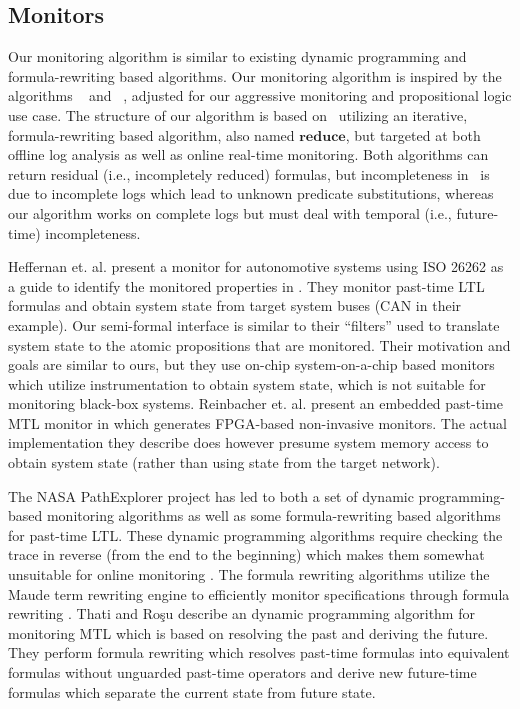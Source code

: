 
\subsection{Monitors}
Our monitoring algorithm is similar to existing dynamic programming and formula-rewriting based algorithms. 
Our monitoring algorithm is inspired by the algorithms \greduce\ \cite{Garg2011} and \precis\ \cite{Chowdhury2014}, adjusted for our aggressive monitoring and propositional logic use case. The structure of our algorithm is based on \greduce\, utilizing an iterative, formula-rewriting based algorithm, also named $\mathbf{reduce}$, but targeted at both offline log analysis as well as online real-time monitoring. Both algorithms can return residual (i.e., incompletely reduced) formulas, but incompleteness in \greduce\ is due to incomplete logs which lead to unknown predicate substitutions, whereas our algorithm works on complete logs but must deal with temporal (i.e., future-time) incompleteness. 

Heffernan et. al. present a monitor for autonomotive systems using ISO 26262 as a guide to identify the monitored properties in \cite{Heffernan2014}. They monitor past-time LTL formulas and obtain system state from target system buses (CAN in their example). Our semi-formal interface is similar to their ``filters'' used to translate system state to the atomic propositions that are monitored. Their motivation and goals are similar to ours, but they use on-chip system-on-a-chip based monitors which utilize instrumentation to obtain system state, which is not suitable for monitoring black-box systems.
Reinbacher et. al. present an embedded past-time MTL monitor in \cite{Reinbacher2013} which generates FPGA-based non-invasive monitors. 
The actual implementation they describe does however presume system memory access to obtain system state (rather than using state from the target network).

The NASA PathExplorer project has led to both a set of dynamic programming-based monitoring algorithms as well as some formula-rewriting based algorithms \cite{Havelund2004} for past-time LTL. These dynamic programming algorithms require checking the trace in reverse (from the end to the beginning) which makes them somewhat unsuitable for online monitoring \cite{Havelund2002}. The formula rewriting algorithms utilize the Maude term rewriting engine to efficiently monitor specifications through formula rewriting \cite{Rosu2005}. 
%
Thati and Ro\c{s}u \cite{Thati2005} describe an dynamic programming algorithm for monitoring MTL which is based on resolving the past and deriving the future. They perform formula rewriting which resolves past-time formulas into equivalent formulas without unguarded past-time operators and derive new future-time formulas which separate the current state from future state. 


